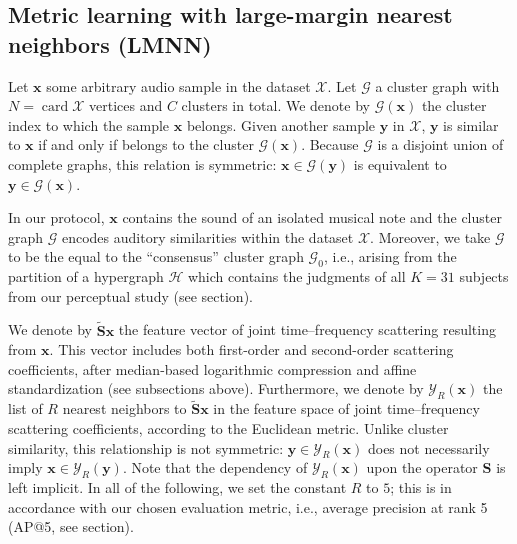 \documentclass{bmcart}
\DeclareMathOperator*{\card}{card}
\newcommand{\lnameref}[1]{%
\bgroup
\let\nmu\MakeLowercase
\nameref{#1}\egroup}
\newcommand{\nmu}{}
\begin{document}
\subsection*{Metric learning with large-margin nearest neighbors (LMNN)}
Let $\boldsymbol{x}$ some arbitrary audio sample in the dataset $\mathcal{X}$.
Let $\mathcal{G}$ a cluster graph with $N = \card \mathcal{X}$ vertices and $C$ clusters in total.
We denote by $\mathcal{G}(\boldsymbol{x})$ the cluster index to which the sample $\boldsymbol{x}$ belongs.
Given another sample $\boldsymbol{y}$ in $\mathcal{X}$, $\boldsymbol{y}$ is similar to $\boldsymbol{x}$ if and only if belongs to the cluster $\mathcal{G}(\boldsymbol{x})$.
Because $\mathcal{G}$ is a disjoint union of complete graphs, this relation is symmetric: $\boldsymbol{x} \in \mathcal{G}(\boldsymbol{y})$ is equivalent to $\boldsymbol{y} \in \mathcal{G}(\boldsymbol{x})$.

In our protocol, $\boldsymbol{x}$ contains the sound of an isolated musical note and the cluster graph $\mathcal{G}$ encodes auditory similarities within the dataset $\mathcal{X}$.
Moreover, we take $\mathcal{G}$ to be the equal to the ``consensus'' cluster graph $\mathcal{G}_0$, i.e., arising from the partition of a hypergraph $\mathcal{H}$ which contains the judgments of all $K=31$ subjects from our perceptual study (see \lnameref{sec:data-collection} section).


We denote by $\mathbf{\widetilde{S}}\boldsymbol{x}$ the feature vector of joint time--frequency scattering resulting from $\boldsymbol{x}$.
This vector includes both first-order and second-order scattering coefficients, after median-based logarithmic compression and affine standardization (see subsections above).
Furthermore, we denote by $\mathcal{Y}_R (\boldsymbol{x})$ the list of $R$ nearest neighbors to $\mathbf{\widetilde{S}}\boldsymbol{x}$ in the feature space of joint time--frequency scattering coefficients, according to the Euclidean metric.
Unlike cluster similarity, this relationship is not symmetric: $\boldsymbol{y}\in\mathcal{Y}_R (\boldsymbol{x})$ does not necessarily imply $\boldsymbol{x}\in\mathcal{Y}_R (\boldsymbol{y})$.
Note that the dependency of $\mathcal{Y}_R (\boldsymbol{x})$ upon the operator $\mathbf{S}$ is left implicit.
In all of the following, we set the constant $R$ to $5$; this is in accordance with our chosen evaluation metric, i.e., average precision at rank 5 (AP@5, see \lnameref{sec:results} section).
\end{document}

